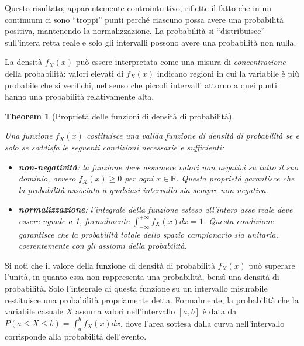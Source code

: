 \documentclass[
  letterpaper,
  DIV=11,
  numbers=noendperiod,
  oneside]{scrreprt}
\theoremstyle{definition}
\theoremstyle{plain}
\newtheorem{theorem}{Theorem}[chapter]
\theoremstyle{definition}
\theoremstyle{remark}
\begin{document}
Questo risultato, apparentemente controintuitivo, riflette il fatto che
in un continuum ci sono ``troppi'' punti perché ciascuno possa avere una
probabilità positiva, mantenendo la normalizzazione. La probabilità si
``distribuisce'' sull'intera retta reale e solo gli intervalli possono
avere una probabilità non nulla.

La densità \(f_X(x)\) può essere interpretata come una misura di
\emph{concentrazione} della probabilità: valori elevati di \(f_X(x)\)
indicano regioni in cui la variabile è più probabile che si verifichi,
nel senso che piccoli intervalli attorno a quei punti hanno una
probabilità relativamente alta.

\begin{theorem}[Proprietà delle funzioni di densità di
probabilità]\protect\hypertarget{thm-pdf-properties}{}\label{thm-pdf-properties}

Una funzione \(f_X(x)\) costituisce una valida funzione di densità di
probabilità se e solo se soddisfa le seguenti condizioni necessarie e
sufficienti:

\begin{itemize}
\item
  \textbf{non-negatività}: la funzione deve assumere valori non negativi
  su tutto il suo dominio, ovvero \(f_X(x) \geq 0\) per ogni
  \(x \in \mathbb{R}\). Questa proprietà garantisce che la probabilità
  associata a qualsiasi intervallo sia sempre non negativa.
\item
  \textbf{normalizzazione}: l'integrale della funzione esteso all'intero
  asse reale deve essere uguale a 1, formalmente
  \(\int_{-\infty}^{+\infty} f_X(x)  dx = 1\). Questa condizione
  garantisce che la probabilità totale dello spazio campionario sia
  unitaria, coerentemente con gli assiomi della probabilità.
\end{itemize}

\end{theorem}

Si noti che il valore della funzione di densità di probabilità
\(f_X(x)\) può superare l'unità, in quanto essa non rappresenta una
probabilità, bensì una densità di probabilità. Solo l'integrale di
questa funzione su un intervallo misurabile restituisce una probabilità
propriamente detta. Formalmente, la probabilità che la variabile casuale
\(X\) assuma valori nell'intervallo \([a,b]\) è data da
\(P(a \leq X \leq b) = \int_a^b f_X(x)  dx\), dove l'area sottesa dalla
curva nell'intervallo corrisponde alla probabilità dell'evento.
\end{document}
